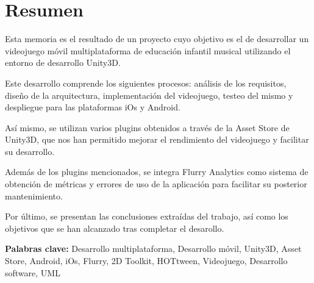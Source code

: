 \cleardoublepage
{}
\chapter*{Resumen}

Esta memoria es el resultado de un proyecto cuyo objetivo es el de desarrollar un videojuego móvil multiplataforma de educación infantil musical utilizando el entorno de desarrollo Unity3D.

Este desarrollo comprende los siguientes procesos: análisis de los requisitos, diseño de la arquitectura, implementación del videojuego, testeo del mismo y despliegue para las plataformas iOs y Android.

Así mismo, se utilizan varios plugins obtenidos a través de la Asset Store de Unity3D, que nos han permitido mejorar el rendimiento del videojuego y facilitar su desarrollo.

Además de los plugins mencionados, se integra Flurry Analytics como sistema de obtención de métricas y errores de uso de la aplicación para facilitar su posterior mantenimiento.

Por último, se presentan las conclusiones extraídas del trabajo, así como los objetivos que se han alcanzado tras completar el desarollo.

\vfill
\textbf{Palabras clave:} Desarrollo multiplataforma, Desarrollo móvil, Unity3D, Asset Store, Android, iOs, Flurry, 2D Toolkit, HOTtween, Videojuego, Desarrollo software, UML